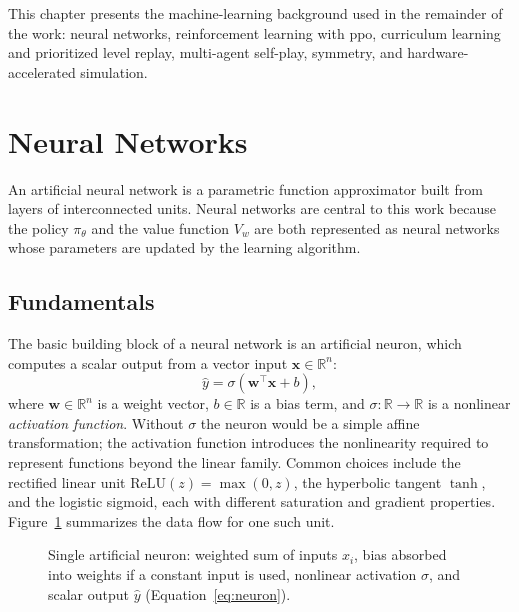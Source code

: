This chapter presents the machine-learning background used in the remainder of the work: neural networks, reinforcement learning with \gls{ppo}, curriculum learning and prioritized level replay,
multi-agent self-play, symmetry, and hardware-accelerated simulation.

\section{Neural Networks}

An artificial neural network is a parametric function approximator built from
layers of interconnected units.  Neural networks are central to this work
because the policy $\pi_\theta$ and the value function $V_w$ are both
represented as neural networks whose parameters are updated by the learning
algorithm.

\subsection{Fundamentals}

The basic building block of a neural network is an artificial neuron, which
computes a scalar output from a vector input $\mathbf{x} \in \mathbb{R}^n$:
%
\begin{equation}
    \hat{y} = \sigma\!\left(\mathbf{w}^\top \mathbf{x} + b\right),
    \label{eq:neuron}
\end{equation}
%
where $\mathbf{w} \in \mathbb{R}^n$ is a weight vector, $b \in \mathbb{R}$ is
a bias term, and $\sigma : \mathbb{R} \to \mathbb{R}$ is a nonlinear
\emph{activation function}.  Without $\sigma$ the neuron would be a simple
affine transformation; the activation function introduces the nonlinearity
required to represent functions beyond the linear family.  Common choices
include the rectified linear unit $\text{ReLU}(z) = \max(0, z)$, the
hyperbolic tangent $\tanh$, and the logistic sigmoid, each with different
saturation and gradient properties.
Figure~\ref{fig:perceptron} summarizes the data flow for one such unit.

\begin{figure}[ht]
    \centering
    \resizebox{0.75\linewidth}{!}{%
    }
    \caption{Single artificial neuron: weighted sum of inputs $x_i$, bias absorbed
    into weights if a constant input is used, nonlinear activation $\sigma$,
    and scalar output $\hat{y}$ (Equation~\eqref{eq:neuron}).}
    \label{fig:perceptron}
\end{figure}

